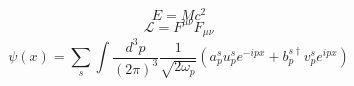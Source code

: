 \documentclass[12pt]{scrartcl}
\begin{document}
\pagestyle{empty}
%
\begin{equation*}
  E = Mc^2
\end{equation*}
%
\newpage
%
\begin{equation*}
\mathcal{L} = F^{\mu \nu} F_{\mu \nu}
\end{equation*}
%
\newpage
%
\begin{equation*}
\psi(x) = \sum_s \int \frac{d^3p}{(2\pi)^3} \frac{1}{\sqrt{2\omega_p}}
\left(
a^s_p u^s_p e^{-ipx} + b^{s\dagger}_p v^s_p e^{ipx}
\right)
\end{equation*}
%
\end{document}
